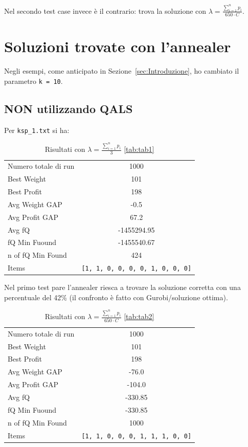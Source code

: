 \documentclass[a4paper,12pt]{article}
\begin{document}
Nel secondo test case invece è il contrario: trova la soluzione con $\lambda = \displaystyle \frac{\sum_{i=1}^{n} p_i}{650 \cdot C}$.

\section{Soluzioni trovate con l'annealer}
Negli esempi, come anticipato in Sezione~\ref{sec:Introduzione}, ho cambiato il parametro \texttt{k = 10}.

\subsection{NON utilizzando QALS}

Per \texttt{ksp\_1.txt} si ha:

\begin{table}[H]
\centering
\begin{tabular}{lc}
\toprule
Numero totale di run & 1000 \\
Best Weight & 101 \\
Best Profit & 198 \\
Avg Weight GAP & -0.5 \\
Avg Profit GAP & 67.2 \\
Avg fQ & -1455294.95 \\
fQ Min Fuound & -1455540.67 \\
n of fQ Min Found & 424 \\
Items & \texttt{[1, 1, 0, 0, 0, 0, 1, 0, 0, 0]} \\
\bottomrule
\end{tabular}
\caption{Risultati con $\lambda = \displaystyle \frac{\sum_{i=1}^{n} p_i}{3}$ \ref{tab:tab1}}
\end{table}

Nel primo test pare l'annealer riesca a trovare la soluzione corretta con una percentuale del 42\% (il 
confronto è fatto con Gurobi/soluzione ottima).

\begin{table}[H]
\centering
\begin{tabular}{lc}
\toprule
Numero totale di run & 1000 \\
Best Weight & 101 \\
Best Profit & 198 \\
Avg Weight GAP & -76.0 \\
Avg Profit GAP & -104.0 \\
Avg fQ & -330.85 \\
fQ Min Fuound & -330.85 \\
n of fQ Min Found & 1000 \\
Items & \texttt{[1, 1, 0, 0, 0, 1, 1, 1, 0, 0]} \\
\bottomrule
\end{tabular}
\caption{Risultati con $\lambda = \displaystyle \frac{\sum_{i=1}^{n} p_i}{650 \cdot C}$ \ref{tab:tab2}}
\end{table}
\end{document}
